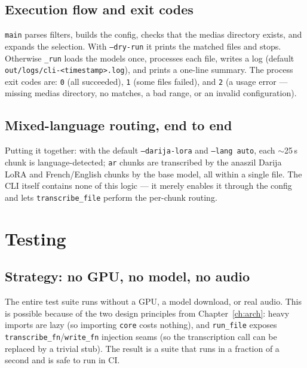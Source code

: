 \documentclass[11pt,a4paper]{report}
\newcommand{\code}[1]{\texttt{\small #1}}
\begin{document}
\section{Execution flow and exit codes}

\code{main} parses filters, builds the config, checks that the medias directory
exists, and expands the selection. With \code{--dry-run} it prints the matched
files and stops. Otherwise \code{\_run} loads the models once, processes each file,
writes a log (default \code{out/logs/cli-<timestamp>.log}), and prints a one-line
summary. The process exit codes are: \code{0} (all succeeded), \code{1} (some
files failed), and \code{2} (a usage error --- missing medias directory, no
matches, a bad range, or an invalid configuration).

\section{Mixed-language routing, end to end}

Putting it together: with the default \code{--darija-lora} and \code{--lang auto},
each $\sim$25\,s chunk is language-detected; \code{ar} chunks are transcribed by
the anaszil Darija LoRA and French/English chunks by the base model, all within a
single file. The CLI itself contains none of this logic --- it merely enables it
through the config and lets \code{transcribe\_file} perform the per-chunk routing.

\chapter{Testing}
\label{ch:testing}

\section{Strategy: no GPU, no model, no audio}

The entire test suite runs without a GPU, a model download, or real audio. This is
possible because of the two design principles from Chapter~\ref{ch:arch}: heavy
imports are lazy (so importing \texttt{core} costs nothing), and \code{run\_file}
exposes \code{transcribe\_fn}/\code{write\_fn} injection seams (so the transcription
call can be replaced by a trivial stub). The result is a suite that runs in a
fraction of a second and is safe to run in CI.
\end{document}

